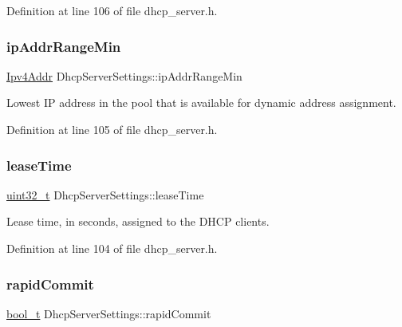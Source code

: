 Definition at line 106 of file dhcp\+\_\+server.\+h.

\mbox{\label{structDhcpServerSettings_abb307df11884b58de9e98b53702abe31}} 
\subsubsection{\texorpdfstring{ip\+Addr\+Range\+Min}{ipAddrRangeMin}}
{\footnotesize\ttfamily \hyperlink{ipv4_8h_a411debb3d770caa0c06d3f73367da37f}{Ipv4\+Addr} Dhcp\+Server\+Settings\+::ip\+Addr\+Range\+Min}



Lowest IP address in the pool that is available for dynamic address assignment. 



Definition at line 105 of file dhcp\+\_\+server.\+h.

\mbox{\label{structDhcpServerSettings_ab2ca89761cb8c1611c0988c4a07d0c54}} 
\subsubsection{\texorpdfstring{lease\+Time}{leaseTime}}
{\footnotesize\ttfamily \hyperlink{stdint_8h_a435d1572bf3f880d55459d9805097f62}{uint32\+\_\+t} Dhcp\+Server\+Settings\+::lease\+Time}



Lease time, in seconds, assigned to the D\+H\+CP clients. 



Definition at line 104 of file dhcp\+\_\+server.\+h.

\mbox{\label{structDhcpServerSettings_a579ebac7fc6a51baa1f70f597309024e}} 
\subsubsection{\texorpdfstring{rapid\+Commit}{rapidCommit}}
{\footnotesize\ttfamily \hyperlink{compiler__port_8h_a812d16e5494522586b3784e55d479912}{bool\+\_\+t} Dhcp\+Server\+Settings\+::rapid\+Commit}



